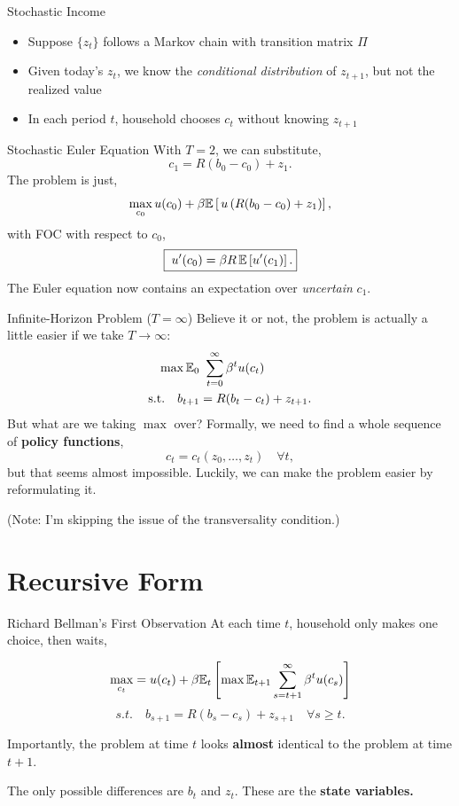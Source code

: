 \documentclass[10pt,aspectratio=169]{beamer}
\begin{document}
\begin{frame}{Stochastic Income}
  \begin{itemize}
    \item Suppose $\{z_t\}$ follows a Markov chain with transition matrix $\Pi$
    \item Given today's $z_t$, we know the \emph{conditional distribution} of $z_{t+1}$, but not the realized value
    \item In each period $t$, household chooses $c_t$ without knowing $z_{t+1}$
  \end{itemize}
\end{frame}

\begin{frame}{Stochastic Euler Equation}
  With $T = 2$, we can substitute,
  \[
    c_1 = R(b_0 - c_0) + z_1.
  \]
  The problem is just,
  \[
    \max_{c_0} u(c_0) + \beta \mathbb{E}\left[\, u\left(R(b_0 - c_0) + z_1\right) \right],
  \]
  with FOC with respect to $c_0$,
  \[
    \boxed{\;u'(c_0) = \beta R \, \mathbb{E}\left[ u'(c_1) \right].}
  \]
  The Euler equation now contains an expectation over \emph{uncertain} $c_1$.
\end{frame}

\begin{frame}{Infinite-Horizon Problem ($T = \infty$)}
  Believe it or not, the problem is actually a little easier if we take $T\to\infty$:
  \begin{align*}
    \max \mathbb{E}_0 & \ \sum_{t=0}^{\infty} \beta^t u(c_t)\\
    \text{s.t.}\quad b_{t+1} &= R(b_t - c_t) + z_{t+1}.
  \end{align*}
  But what are we taking $\max$ over? Formally, we need to find a whole sequence of \textbf{policy functions},
  \[
    c_t = c_t(z_0, \ldots, z_t) \quad \forall t,
  \]
  but that seems almost impossible. Luckily, we can make the problem easier by reformulating it.

  (Note: I'm skipping the issue of the transversality condition.)
\end{frame}

\section{Recursive Form}

\begin{frame}{Richard Bellman's First Observation}
  At each time $t$, household only makes one choice, then waits,

  \[
    \max_{c_t} = u(c_t) + \beta \mathbb{E}_t\left[ \max \mathbb{E}_{t+1}\sum_{s=t+1}^\infty \beta^t u(c_s) \right]
  \]
  \[
    s.t. \quad b_{s+1} = R(b_s - c_s) + z_{s+1} \quad\forall s \ge t.
  \]

  Importantly, the problem at time $t$ looks \textbf{almost} identical to the problem at time $t+1$.

  The only possible differences are $b_t$ and $z_t$. These are the \textbf{state variables.}
\end{frame}
\end{document}
